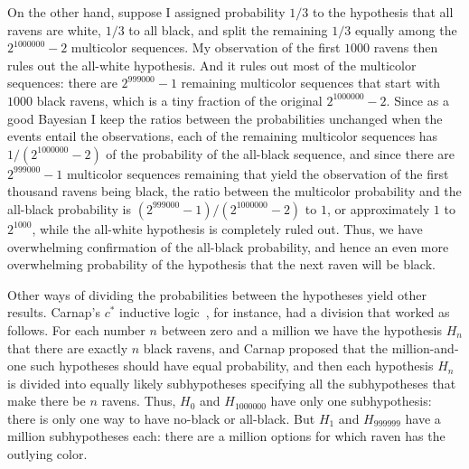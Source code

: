 On the other hand, suppose I assigned probability $1/3$ to the hypothesis that all ravens are white, $1/3$ to all black,
and split the remaining $1/3$ equally among the $2^{1000000}-2$ multicolor sequences. My observation of the first $1000$
ravens then rules out the all-white  hypothesis. And it rules out most of the multicolor sequences: there are $2^{999000}-1$
remaining multicolor sequences that start with $1000$ black ravens, which is a tiny fraction of the original $2^{1000000}-2$. Since as a 
good Bayesian I keep the ratios between the probabilities unchanged when the events entail the observations, each of the remaining multicolor sequences has 
$1/(2^{1000000}-2)$ of the probability of the all-black sequence, and since there are $2^{999000}-1$ multicolor
sequences remaining that yield the observation of the first thousand ravens being black, the ratio between the multicolor probability and the all-black probability
is $(2^{999000}-1)/(2^{1000000}-2)$ to $1$, or approximately $1$ to $2^{1000}$, while the all-white hypothesis
is completely ruled out. Thus, we have overwhelming confirmation of 
the all-black probability, and hence an even more overwhelming probability of the hypothesis that the next raven will be black.

Other ways of dividing the probabilities between the hypotheses yield other results. Carnap's $c^*$ inductive
logic~\parencite{CarnapLFP2}, for instance, had a division
that worked as follows. For each number $n$ between zero and a million we have the hypothesis $H_n$ that there are exactly 
$n$ black ravens, and Carnap proposed that the million-and-one such hypotheses should have equal probability, and then 
each hypothesis $H_n$ is divided into equally likely subhypotheses specifying all the subhypotheses that make there be $n$
ravens. Thus, $H_0$ and $H_{1000000}$ have only one subhypothesis: there is only one way to have no-black or all-black. But
$H_1$ and $H_{999999}$ have a million subhypotheses each: there are a million options for which raven has the outlying
color. 

